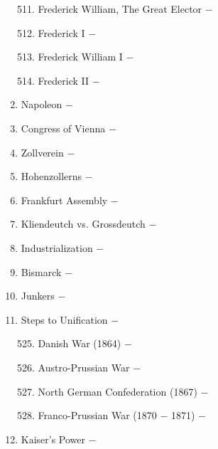 \documentclass[12pt]{article}
\begin{document}
\begin{enumerate}
\begin{enumerate}[label=\arabic{*}.]
\setcounter{enumii}{510}

\item Frederick William, The Great Elector $-$ 

\item Frederick I $-$ 

\item Frederick William I $-$ 

\item Frederick II $-$ 

\end{enumerate}
\setcounter{enumi}{514}

\item Napoleon $-$ 

\item Congress of Vienna $-$ 

\item Zollverein $-$ 

\item Hohenzollerns $-$ 

\item Frankfurt Assembly $-$ 

\item Kliendeutch vs. Grossdeutch $-$ 

\item Industrialization $-$ 

\item Bismarck $-$ 

\item Junkers $-$ 

\item Steps to Unification $-$ 

\begin{enumerate}[label=\arabic{*}.]
\setcounter{enumii}{524}

\item Danish War (1864) $-$ 

\item Austro-Prussian War $-$ 

\item North German Confederation (1867) $-$ 

\item Franco-Prussian War (1870 $-$ 1871) $-$ 

\end{enumerate}
\setcounter{enumi}{528}


\item Kaiser's Power $-$ 


\end{enumerate}
\end{document}
